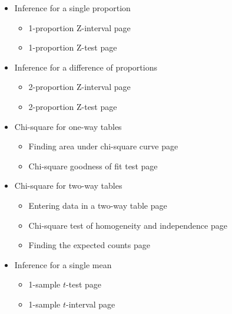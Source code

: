 \begin{itemize}
\item[]  Inference for a single proportion

\begin{itemize}\vspace{-1mm}
\setlength{\itemsep}{0mm}
\item[] 1-proportion Z-interval \hfill page~\pageref{1PropZInt}
\item[] 1-proportion Z-test \hfill page~\pageref{1propZtest}
\end{itemize}

\item[] Inference for a difference of proportions
\begin{itemize}\vspace{-1mm}
\setlength{\itemsep}{0mm}
\item[] 2-proportion Z-interval \hfill page~\pageref{2propZint}
\item[] 2-proportion Z-test \hfill page~\pageref{2propZtest}
\end{itemize}


\item[] Chi-square for one-way tables
\begin{itemize}\vspace{-1mm}
\setlength{\itemsep}{0mm}
\item[] Finding area under chi-square curve \hfill page~\pageref{chisqtail}
\item[] Chi-square goodness of fit test \hfill page~\pageref{GOF}
\end{itemize}


\item[]  Chi-square for two-way tables
\begin{itemize}\vspace{-1mm}
\setlength{\itemsep}{0mm}
\item[] Entering data in a two-way table \hfill page~\pageref{2waytable}
\item[] Chi-square test of homogeneity and independence  \hfill page~\pageref{chisq2waytest}
\item[] Finding the expected counts  \hfill page~\pageref{expectedcounts}
\end{itemize}

\item[]  Inference for a single mean
\begin{itemize}\vspace{-1mm}
\setlength{\itemsep}{0mm}
\item[] 1-sample $t$-test  \hfill page~\pageref{1SampTtest}
\item[] 1-sample $t$-interval \hfill page~\pageref{1SampTint}
\end{itemize}




\end{itemize}
